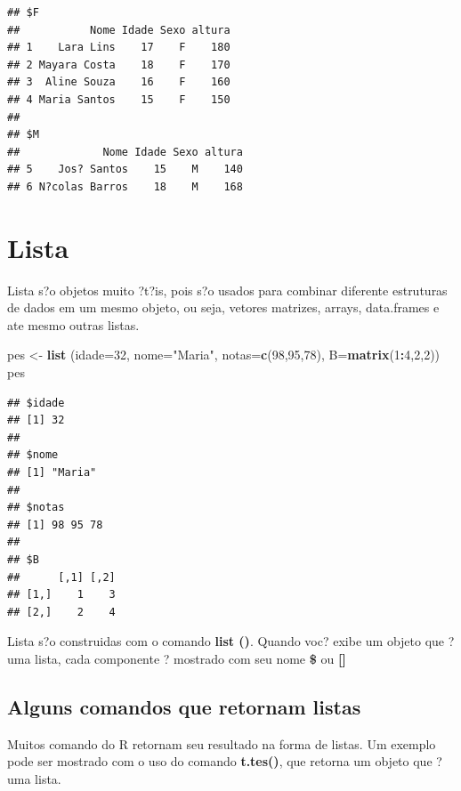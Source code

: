 \documentclass[]{book}
\newenvironment{Shaded}{\begin{snugshade}}{\end{snugshade}}
\newcommand{\DataTypeTok}[1]{\textcolor[rgb]{0.13,0.29,0.53}{#1}}
\newcommand{\DecValTok}[1]{\textcolor[rgb]{0.00,0.00,0.81}{#1}}
\newcommand{\KeywordTok}[1]{\textcolor[rgb]{0.13,0.29,0.53}{\textbf{#1}}}
\newcommand{\NormalTok}[1]{#1}
\newcommand{\OperatorTok}[1]{\textcolor[rgb]{0.81,0.36,0.00}{\textbf{#1}}}
\newcommand{\StringTok}[1]{\textcolor[rgb]{0.31,0.60,0.02}{#1}}
\begin{document}
\begin{verbatim}
## $F
##           Nome Idade Sexo altura
## 1    Lara Lins    17    F    180
## 2 Mayara Costa    18    F    170
## 3  Aline Souza    16    F    160
## 4 Maria Santos    15    F    150
## 
## $M
##             Nome Idade Sexo altura
## 5    Jos? Santos    15    M    140
## 6 N?colas Barros    18    M    168
\end{verbatim}

\hypertarget{lista}{%
\section{Lista}\label{lista}}

Lista s?o objetos muito ?t?is, pois s?o usados para combinar diferente estruturas de dados em um mesmo objeto, ou seja, vetores matrizes, arrays, data.frames e ate mesmo outras listas.

\begin{Shaded}
\begin{Highlighting}[]
\NormalTok{pes <-}\StringTok{ }\KeywordTok{list}\NormalTok{ (}\DataTypeTok{idade=}\DecValTok{32}\NormalTok{, }\DataTypeTok{nome=}\StringTok{"Maria"}\NormalTok{, }\DataTypeTok{notas=}\KeywordTok{c}\NormalTok{(}\DecValTok{98}\NormalTok{,}\DecValTok{95}\NormalTok{,}\DecValTok{78}\NormalTok{), }\DataTypeTok{B=}\KeywordTok{matrix}\NormalTok{(}\DecValTok{1}\OperatorTok{:}\DecValTok{4}\NormalTok{,}\DecValTok{2}\NormalTok{,}\DecValTok{2}\NormalTok{))}
\NormalTok{pes}
\end{Highlighting}
\end{Shaded}

\begin{verbatim}
## $idade
## [1] 32
## 
## $nome
## [1] "Maria"
## 
## $notas
## [1] 98 95 78
## 
## $B
##      [,1] [,2]
## [1,]    1    3
## [2,]    2    4
\end{verbatim}

Lista s?o construidas com o comando \textbf{list ()}. Quando voc? exibe um objeto que ? uma lista, cada componente ? mostrado com seu nome \textbf{\$} ou \textbf{{[}{]}}

\hypertarget{alguns-comandos-que-retornam-listas}{%
\subsection{Alguns comandos que retornam listas}\label{alguns-comandos-que-retornam-listas}}

Muitos comando do R retornam seu resultado na forma de listas. Um exemplo pode ser mostrado com o uso do comando \textbf{t.tes()}, que retorna um objeto que ? uma lista.
\end{document}
